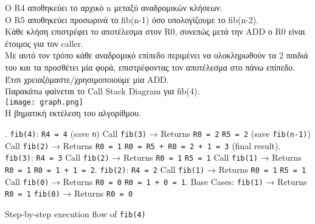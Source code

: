 \documentclass{article}
\begin{document}
Ο R4 αποθηκεύει το αρχικό n μεταξύ αναδρομικών κλήσεων. \\
Ο R5 αποθηκεύει προσωρινά το fib(n-1) όσο υπολογίζουμε το fib(n-2). \\

Κάθε κλήση επιστρέφει το αποτέλεσμα στον R0, συνεπώς μετά την ADD ο R0 είναι έτοιμος για τον caller. \\

Με αυτό τον τρόπο κάθε αναδρομικό επίπεδο περιμένει να ολοκληρωθούν τα 2 παιδιά του και τα προσθέτει μία φορά, επιστρέφοντας τον αποτέλεσμα στο πάνω επίπεδο. \\

Έτσι χρειαζόμαστε/χρησιμοποιούμε μία ADD. \\

Παρακάτω φαίνεται το Call Stack Diagram για fib(4). \\

\texttt{[image: graph.png]} \\ 

Η βηματική εκτέλεση του αλγορίθμου. \\

\begin{algorithm}[H]
\SetAlgoLined
{}
. \texttt{fib(4)}:  
   \quad \texttt{R4 = 4} (save \texttt{n})  
   \quad Call \texttt{fib(3)} → Returns \texttt{R0 = 2}  
   \quad \texttt{R5 = 2} (save \texttt{fib(n-1)})  
   \quad Call \texttt{fib(2)} → Returns \texttt{R0 = 1}  
   \quad \texttt{R0 = R5 + R0 = 2 + 1 = 3} (final result). \texttt{fib(3)}:  
   \quad \texttt{R4 = 3}  
   \quad Call \texttt{fib(2)} → Returns \texttt{R0 = 1}  
   \quad \texttt{R5 = 1}  
   \quad Call \texttt{fib(1)} → Returns \texttt{R0 = 1}  
   \quad \texttt{R0 = 1 + 1 = 2}. \texttt{fib(2)}:  
   \quad \texttt{R4 = 2}  
   \quad Call \texttt{fib(1)} → Returns \texttt{R0 = 1}  
   \quad \texttt{R5 = 1}  
   \quad Call \texttt{fib(0)} → Returns \texttt{R0 = 0}  
   \quad \texttt{R0 = 1 + 0 = 1}. Base Cases:  
   \quad \texttt{fib(1)} → Returns \texttt{R0 = 1}  
   \quad \texttt{fib(0)} → Returns \texttt{R0 = 0}\;
\caption{Step-by-step execution flow of \texttt{fib(4)}}
\end{algorithm}
\end{document}
